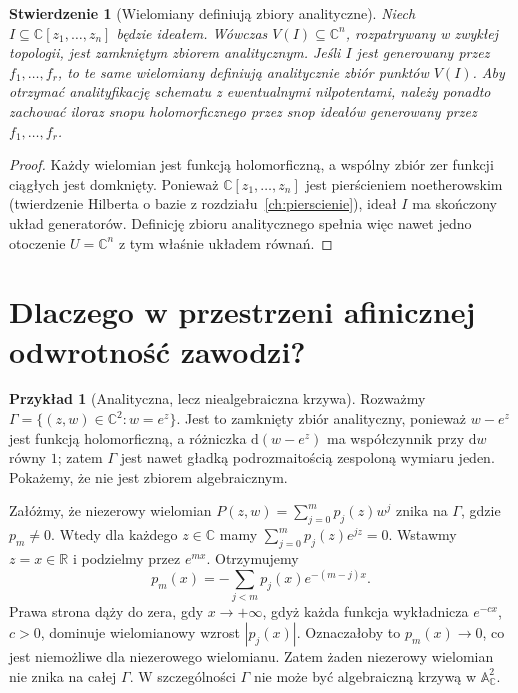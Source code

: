 \documentclass[11pt,a4paper,openany]{report}
\numberwithin{equation}{section}
\theoremstyle{plain}
\newtheorem{stwierdzenie}[twierdzenie]{Stwierdzenie}
\theoremstyle{definition}
\newtheorem{przyklad}[twierdzenie]{Przykład}
\theoremstyle{remark}
\newcommand{\R}{\mathbb R}
\newcommand{\C}{\mathbb C}
\newcommand{\A}{\mathbb A}
\begin{document}
\begin{stwierdzenie}[Wielomiany definiują zbiory analityczne]
Niech $I\subseteq\C[z_1,\ldots,z_n]$ będzie ideałem. Wówczas
$V(I)\subseteq\C^n$, rozpatrywany w zwykłej topologii, jest
zamkniętym zbiorem analitycznym. Jeśli $I$ jest generowany przez $f_1,\ldots,f_r$, to te same
wielomiany definiują analitycznie \emph{zbiór punktów} $V(I)$.
Aby otrzymać analityfikację schematu z ewentualnymi nilpotentami,
należy ponadto zachować iloraz snopu holomorficznego przez snop
ideałów generowany przez $f_1,\ldots,f_r$.
\end{stwierdzenie}
\begin{proof}
Każdy wielomian jest funkcją holomorficzną, a wspólny zbiór zer
funkcji ciągłych jest domknięty. Ponieważ $\C[z_1,\ldots,z_n]$ jest
pierścieniem noetherowskim (twierdzenie Hilberta o bazie z
rozdziału~\ref{ch:pierscienie}), ideał $I$ ma skończony układ
generatorów. Definicję zbioru analitycznego spełnia więc nawet
jedno otoczenie $U=\C^n$ z tym właśnie układem równań.
\end{proof}

\section{Dlaczego w przestrzeni afinicznej odwrotność zawodzi?}
\label{sec:ga9-wykladnicza}

\begin{przyklad}[Analityczna, lecz niealgebraiczna krzywa]
\label{prz:ga9-exp}
Rozważmy $\Gamma=\{(z,w)\in\C^2:w=e^z\}$.
Jest to zamknięty zbiór analityczny, ponieważ $w-e^z$ jest
funkcją holomorficzną, a różniczka $\mathrm d(w-e^z)$ ma współczynnik
przy $\mathrm dw$ równy $1$; zatem $\Gamma$ jest nawet gładką
podrozmaitością zespoloną wymiaru jeden. Pokażemy, że nie jest
zbiorem algebraicznym.

Załóżmy, że niezerowy wielomian $P(z,w)=\sum_{j=0}^m p_j(z)w^j$
znika na $\Gamma$, gdzie $p_m\ne0$. Wtedy dla każdego $z\in\C$
mamy $\sum_{j=0}^m p_j(z)e^{jz}=0$. Wstawmy $z=x\in\R$
i podzielmy przez $e^{mx}$. Otrzymujemy
\[
 p_m(x)=-\sum_{j<m}p_j(x)e^{-(m-j)x}.
\]
Prawa strona dąży do zera, gdy $x\to+\infty$, gdyż każda
funkcja wykładnicza $e^{-cx}$, $c>0$, dominuje wielomianowy
wzrost $|p_j(x)|$. Oznaczałoby to $p_m(x)\to0$, co jest niemożliwe
dla niezerowego wielomianu. Zatem żaden niezerowy wielomian
nie znika na całej $\Gamma$. W szczególności $\Gamma$ nie może
być algebraiczną krzywą w $\A^2_\C$.
\end{przyklad}
\end{document}
